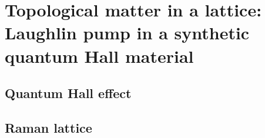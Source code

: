 
\renewcommand{\thechapter}{9}

\chapter{Topological matter in a lattice: Laughlin pump in a synthetic quantum Hall material}
 
\section{Quantum Hall effect}

\section{Raman lattice}










